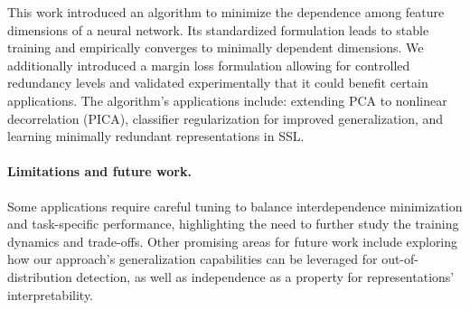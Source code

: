 This work introduced an algorithm to minimize the dependence among feature dimensions of a neural network. 
Its standardized formulation leads to stable training and empirically converges to minimally dependent dimensions. 
We additionally introduced a margin loss formulation allowing for controlled redundancy levels and validated experimentally that it could benefit certain applications. 
The algorithm's applications include: extending PCA to nonlinear decorrelation (PICA), classifier regularization for improved generalization, and learning minimally redundant representations in SSL. 

\paragraph{Limitations and future work. } 
Some applications require careful tuning to balance interdependence minimization and task-specific performance, highlighting the need to further study the training dynamics and trade-offs. 
Other promising areas for future work include exploring how our approach's generalization capabilities can be leveraged for out-of-distribution detection, as well as independence as a property for representations' interpretability. 




